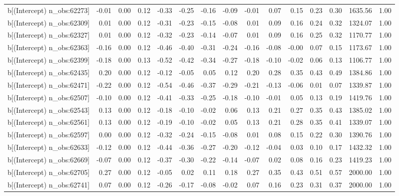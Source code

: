 \begin{table}[ht]
\begin{tabular}{rrrrrrrrrrrrrrr}
  b[(Intercept) n\_obs:62273] & -0.01 & 0.00 & 0.12 & -0.33 & -0.25 & -0.16 & -0.09 & -0.01 & 0.07 & 0.15 & 0.23 & 0.30 & 1635.56 & 1.00 \\ 
  b[(Intercept) n\_obs:62309] & 0.01 & 0.00 & 0.12 & -0.31 & -0.23 & -0.15 & -0.08 & 0.01 & 0.09 & 0.16 & 0.24 & 0.32 & 1324.07 & 1.00 \\ 
  b[(Intercept) n\_obs:62327] & 0.01 & 0.00 & 0.12 & -0.32 & -0.23 & -0.14 & -0.07 & 0.01 & 0.09 & 0.16 & 0.25 & 0.32 & 1170.77 & 1.00 \\ 
  b[(Intercept) n\_obs:62363] & -0.16 & 0.00 & 0.12 & -0.46 & -0.40 & -0.31 & -0.24 & -0.16 & -0.08 & -0.00 & 0.07 & 0.15 & 1173.67 & 1.00 \\ 
  b[(Intercept) n\_obs:62399] & -0.18 & 0.00 & 0.13 & -0.52 & -0.42 & -0.34 & -0.27 & -0.18 & -0.10 & -0.02 & 0.06 & 0.13 & 1106.77 & 1.00 \\ 
  b[(Intercept) n\_obs:62435] & 0.20 & 0.00 & 0.12 & -0.12 & -0.05 & 0.05 & 0.12 & 0.20 & 0.28 & 0.35 & 0.43 & 0.49 & 1384.86 & 1.00 \\ 
  b[(Intercept) n\_obs:62471] & -0.22 & 0.00 & 0.12 & -0.54 & -0.46 & -0.37 & -0.29 & -0.21 & -0.13 & -0.06 & 0.01 & 0.07 & 1339.87 & 1.00 \\ 
  b[(Intercept) n\_obs:62507] & -0.10 & 0.00 & 0.12 & -0.41 & -0.33 & -0.25 & -0.18 & -0.10 & -0.01 & 0.05 & 0.13 & 0.19 & 1419.76 & 1.00 \\ 
  b[(Intercept) n\_obs:62543] & 0.13 & 0.00 & 0.12 & -0.18 & -0.10 & -0.02 & 0.06 & 0.13 & 0.21 & 0.27 & 0.35 & 0.43 & 1385.02 & 1.00 \\ 
  b[(Intercept) n\_obs:62561] & 0.13 & 0.00 & 0.12 & -0.19 & -0.10 & -0.02 & 0.05 & 0.13 & 0.21 & 0.28 & 0.35 & 0.41 & 1339.07 & 1.00 \\ 
  b[(Intercept) n\_obs:62597] & 0.00 & 0.00 & 0.12 & -0.32 & -0.24 & -0.15 & -0.08 & 0.01 & 0.08 & 0.15 & 0.22 & 0.30 & 1390.76 & 1.00 \\ 
  b[(Intercept) n\_obs:62633] & -0.12 & 0.00 & 0.12 & -0.44 & -0.36 & -0.27 & -0.20 & -0.12 & -0.04 & 0.03 & 0.10 & 0.17 & 1432.32 & 1.00 \\ 
  b[(Intercept) n\_obs:62669] & -0.07 & 0.00 & 0.12 & -0.37 & -0.30 & -0.22 & -0.14 & -0.07 & 0.02 & 0.08 & 0.16 & 0.23 & 1419.23 & 1.00 \\ 
  b[(Intercept) n\_obs:62705] & 0.27 & 0.00 & 0.12 & -0.05 & 0.02 & 0.11 & 0.18 & 0.27 & 0.35 & 0.43 & 0.51 & 0.57 & 2000.00 & 1.00 \\ 
  b[(Intercept) n\_obs:62741] & 0.07 & 0.00 & 0.12 & -0.26 & -0.17 & -0.08 & -0.02 & 0.07 & 0.16 & 0.23 & 0.31 & 0.37 & 2000.00 & 1.00 \\ 

\end{tabular}
\end{table}
